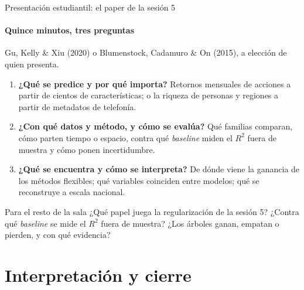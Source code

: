 \documentclass{beamer}
\newcommand{\1}{\mathbb{I}}
\begin{document}
\begin{frame}{Presentación estudiantil: el paper de la sesión 5}
\framesubtitle{Quince minutos, tres preguntas}
\small
Gu, Kelly \& Xiu (2020) o Blumenstock, Cadamuro \& On (2015), a elección de quien presenta.
\begin{enumerate}\itemsep2pt
  \item \textbf{¿Qué se predice y por qué importa?} Retornos mensuales de acciones a partir de cientos de características; o la riqueza de personas y regiones a partir de metadatos de telefonía.
  \item \textbf{¿Con qué datos y método, y cómo se evalúa?} Qué familias comparan, cómo parten tiempo o espacio, contra qué \emph{baseline} miden el $R^2$ fuera de muestra y cómo ponen incertidumbre.
  \item \textbf{¿Qué se encuentra y cómo se interpreta?} De dónde viene la ganancia de los métodos flexibles; qué variables coinciden entre modelos; qué se reconstruye a escala nacional.
\end{enumerate}
\pause
\begin{block}{Para el resto de la sala}
¿Qué papel juega la regularización de la sesión 5? ¿Contra qué \emph{baseline} se mide el $R^2$ fuera de muestra? ¿Los árboles ganan, empatan o pierden, y con qué evidencia?
\end{block}
\end{frame}


\section{Interpretación y cierre}
\begin{frame}[noframenumbering]
\tableofcontents[currentsection]
\end{frame}
\end{document}
